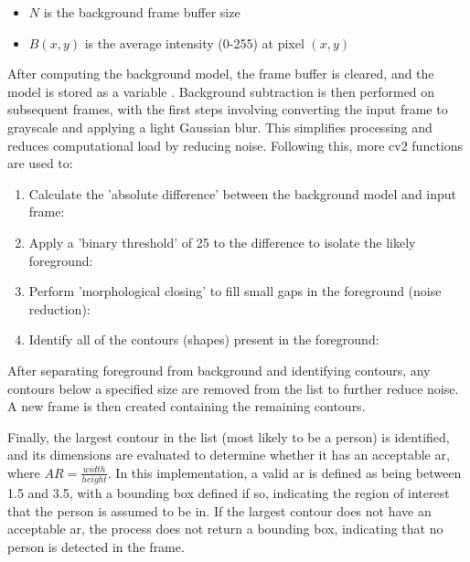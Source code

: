 \begin{itemize}
	\item $N$ is the background frame buffer size
	\item $B(x,y)$ is the average intensity (0-255) at pixel $(x,y)$
\end{itemize}

After computing the background model, the frame buffer is cleared, and the model is stored as a variable .
Background subtraction is then performed on subsequent frames, with the first steps involving converting the input frame to grayscale and applying a light Gaussian blur. This simplifies processing and reduces computational load by reducing noise. Following this, more \ac{cv2} functions are used to:

\begin{enumerate}
	\item Calculate the 'absolute difference' between the background model and input frame: 
	\item Apply a 'binary threshold' of 25 to the difference to isolate the likely foreground: 
	\item Perform 'morphological closing' to fill small gaps in the foreground (noise reduction): 
	\item Identify all of the contours (shapes) present in the foreground: 
\end{enumerate}

After separating foreground from background and identifying contours, any contours below a specified size  are removed from the list to further reduce noise.
A new frame is then created containing the remaining contours.

Finally, the largest contour in the list (most likely to be a person) is identified, and its dimensions are evaluated to determine whether it has an acceptable \ac{ar}, where $AR=\frac{width}{height}$.
In this implementation, a valid \ac{ar} is defined as being between 1.5 and 3.5, with a bounding box defined if so, indicating the region of interest that the person is assumed to be in. 
If the largest contour does not have an acceptable \ac{ar}, the process does not return a bounding box, indicating that no person is detected in the frame.

